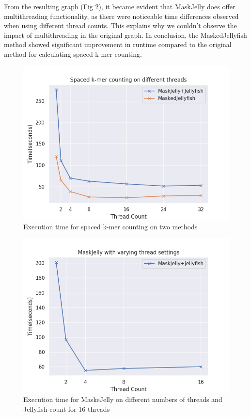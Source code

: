 \documentclass{PHlab-thesis}
\begin{document}
From the resulting graph (Fig \ref{fig:MaskJelly_thread}), it became evident that MaskJelly does offer multithreading functionality, as there were noticeable time differences observed when using different thread counts. This explains why we couldn't observe the impact of multithreading in the original graph. In conclusion, the MaskedJellyfish method showed significant improvement in runtime compared to the original method for calculating spaced k-mer counting.
\begin{figure}
	\centering
	\includegraphics[scale=0.7]{figures/M_compare.png}
	\caption{Execution time for spaced k-mer counting on two methods}
	\label{fig:thread_compare} %
\end{figure}
\begin{figure}
	\centering
	\includegraphics[scale=0.7]{figures/MaskJelly_thread.png}
	\caption{Execution time for MaskeJelly on different numbers of threads and Jellyfish count for 16 threads}
	\label{fig:MaskJelly_thread} %
\end{figure}
\end{document}
